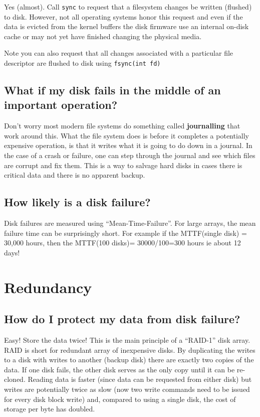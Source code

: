Yes (almost). Call \texttt{sync} to request that a filesystem changes be
written (flushed) to disk. However, not all operating systems honor this
request and even if the data is evicted from the kernel buffers the disk
firmware use an internal on-disk cache or may not yet have finished
changing the physical media.

Note you can also request that all changes associated with a particular
file descriptor are flushed to disk using \texttt{fsync(int\ fd)}

\subsection{What if my disk fails in the middle of an important
operation?}\label{what-if-my-disk-fails-in-the-middle-of-an-important-operation}

Don't worry most modern file systems do something called
\textbf{journalling} that work around this. What the file system does is
before it completes a potentially expensive operation, is that it writes
what it is going to do down in a journal. In the case of a crash or
failure, one can step through the journal and see which files are
corrupt and fix them. This is a way to salvage hard disks in cases there
is critical data and there is no apparent backup.

\subsection{How likely is a disk
failure?}\label{how-likely-is-a-disk-failure}

Disk failures are measured using ``Mean-Time-Failure''. For large
arrays, the mean failure time can be surprisingly short. For example if
the MTTF(single disk) = 30,000 hours, then the MTTF(100 disks)=
30000/100=300 hours ie about 12 days!

\section{Redundancy}\label{redundancy}

\subsection{How do I protect my data from disk
failure?}\label{how-do-i-protect-my-data-from-disk-failure}

Easy! Store the data twice! This is the main principle of a ``RAID-1''
disk array. RAID is short for redundant array of inexpensive disks. By
duplicating the writes to a disk with writes to another (backup disk)
there are exactly two copies of the data. If one disk fails, the other
disk serves as the only copy until it can be re-cloned. Reading data is
faster (since data can be requested from either disk) but writes are
potentially twice as slow (now two write commands need to be issued for
every disk block write) and, compared to using a single disk, the cost
of storage per byte has doubled.

